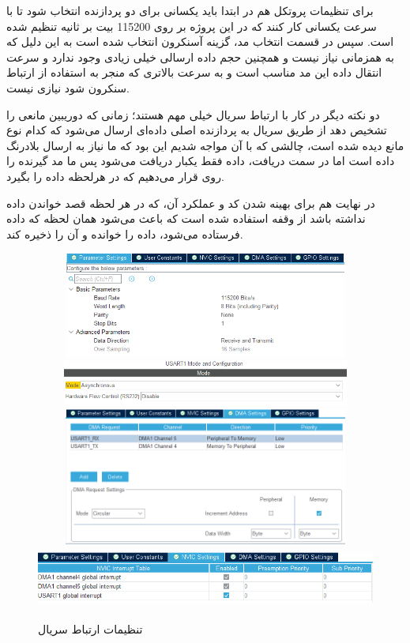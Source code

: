 برای تنظیمات پروتکل  هم در ابتدا باید  یکسانی برای دو پردازنده انتخاب شود تا با سرعت یکسانی کار کنند که در این پروژه بر روی 115200 بیت بر ثانیه تنظیم شده است. سپس در قسمت انتخاب مد، گزینه آسنکرون انتخاب شده است به این دلیل که به همزمانی نیاز نیست و همچنین حجم داده ارسالی خیلی زیادی وجود ندارد و سرعت انتقال داده این مد مناسب است و به سرعت بالاتری که منجر به استفاده از ارتباط سنکرون شود نیازی نیست.

دو نکته دیگر در کار با ارتباط سریال خیلی مهم هستند؛ زمانی که دوریبین مانعی را تشخیص دهد از طریق سریال به پردازنده اصلی داده‌ای ارسال می‌شود که کدام نوع مانع دیده شده است، چالشی که با آن مواجه شدیم این بود که ما نیاز به ارسال بلادرنگ داده است اما در سمت دریافت، داده فقط یکبار دریافت می‌شود پس ما مد گیرنده را روی  قرار می‌دهیم که در هرلحظه داده را بگیرد.

در نهایت هم برای بهینه شدن کد و عملکرد آن، که در هر لحظه قصد خواندن داده نداشته باشد از وقفه استفاده شده است که باعث می‌شود همان لحظه که داده فرستاده می‌شود، داده را خوانده و آن را ذخیره کند.

    \begin{figure}[!h]
	\centering
	\includegraphics[height=3.5cm,width=12cm]{./Images/CH4/CubeMX_UART_Config_1.PNG}
	\includegraphics[height=1.5cm,width=12cm]{./Images/CH4/CubeMX_UART_Config_4.PNG}
	\includegraphics[height=4.5cm,width=12cm]{./Images/CH4/CubeMX_UART_Config_3.PNG}
	\includegraphics[height=2cm,width=12cm]{./Images/CH4/CubeMX_UART_Config_2.PNG}
	\caption[تنظیمات ارتباط سریال]{تنظیمات ارتباط سریال}
	\label{تنظیمات ارتباط سریال}
	\end{figure}

